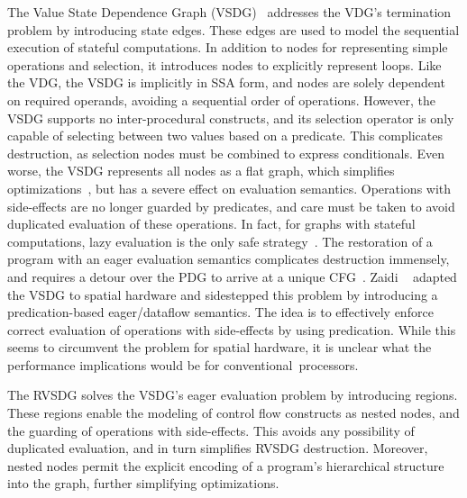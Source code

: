 The Value State Dependence Graph (VSDG)~\cite{Johnson03,Johnson04} addresses the VDG's termination
problem by introducing state edges. These edges are used to model the sequential
execution of stateful computations. In addition to nodes for representing simple operations
and selection, it introduces nodes to explicitly represent loops. Like the VDG, the VSDG is
implicitly in SSA form, and nodes are solely dependent on required operands, avoiding a sequential
order of operations. However, the VSDG supports no inter-procedural constructs, and its selection
operator is only capable of selecting between two values based on a predicate. This complicates
destruction, as selection nodes must be combined to express conditionals. Even worse, the VSDG
represents all nodes as a flat graph, which simplifies optimizations~\cite{Johnson04}, but has a
severe effect on evaluation semantics. Operations with side-effects are no longer guarded by
predicates, and care must be taken to avoid duplicated evaluation of these operations. In fact,
for graphs with stateful computations, lazy evaluation is the only safe strategy~\cite{Lawrence07}.
The restoration of a program with an eager evaluation semantics complicates destruction immensely,
and requires a detour over the PDG to arrive at a unique CFG~\cite{Lawrence07}.
Zaidi \etal~\cite{Zaidi15-2,Zaidi15} adapted the VSDG to spatial hardware and sidestepped this
problem by introducing a predication-based eager/dataflow semantics. The idea is to effectively
enforce correct evaluation of operations with side-effects by using predication. While this seems
to circumvent the problem for spatial hardware, it is unclear what the performance implications
would be for conventional~processors.

The RVSDG solves the VSDG's eager evaluation problem by introducing regions. %
These regions enable the modeling of control flow constructs as nested nodes, and the guarding of
operations with side-effects. This avoids any possibility of duplicated evaluation, and in turn
simplifies RVSDG destruction. Moreover, nested nodes permit the explicit encoding of a program's
hierarchical structure into the graph, further simplifying optimizations.



